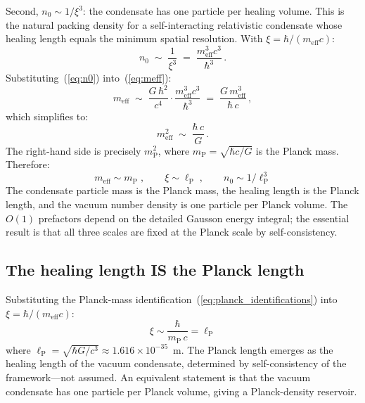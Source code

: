 \documentclass[12pt, a4paper]{article}
\newcommand{\meff}{m_{\mathrm{eff}}}
\newcommand{\lP}{\ell_{\mathrm{P}}}
\newcommand{\mP}{m_{\mathrm{P}}}
\begin{document}
Second, $n_0 \sim 1/\xi^3$: the condensate has one
particle per healing volume. This is the natural
packing density for a self-interacting relativistic
condensate whose healing length equals the minimum
spatial resolution. With $\xi = \hbar/(\meff c)$:
\begin{equation}
    n_0 \;\sim\; \frac{1}{\xi^3}
    \;=\;\frac{\meff^3 c^3}{\hbar^3}\,.
\label{eq:n0}
\end{equation}
Substituting~(\ref{eq:n0}) into~(\ref{eq:meff}):
\begin{equation}
    \meff \;\sim\; \frac{G\,\hbar^2}{c^4}
    \cdot \frac{\meff^3 c^3}{\hbar^3}
    \;=\;\frac{G\,\meff^3}{\hbar\,c}\,,
\end{equation}
which simplifies to:
\begin{equation}
    \meff^2 \;\sim\; \frac{\hbar\,c}{G}\,.
\label{eq:meff_closure}
\end{equation}
The right-hand side is precisely $\mP^2$, where
$\mP = \sqrt{\hbar c/G}$ is the Planck mass.
Therefore:
\begin{equation}
    \boxed{\;\meff \sim \mP\;,\qquad
    \xi \sim \lP\;,\qquad
    n_0 \sim 1/\lP^3\;}
\label{eq:planck_identifications}
\end{equation}
The condensate particle mass is the Planck mass, the
healing length is the Planck length, and the vacuum
number density is one particle per Planck volume.
The $O(1)$ prefactors depend on the detailed Gausson
energy integral; the essential result is that all
three scales are fixed at the Planck scale by
self-consistency.

\subsection{The healing length IS the Planck length}

Substituting the Planck-mass identification~(\ref{eq:planck_identifications})
into $\xi = \hbar/(\meff c)$:
\begin{equation}
    \boxed{\;\xi\sim\frac{\hbar}{\mP\,c}=\lP\;}
\label{eq:xi_planck}
\end{equation}
where $\lP = \sqrt{\hbar G/c^3} \approx 1.616 \times
10^{-35}$~m. The Planck length emerges as the healing
length of the vacuum condensate, determined by
self-consistency of the framework---not assumed. An
equivalent statement is that the vacuum condensate has
one particle per Planck volume, giving a Planck-density
reservoir.

\end{document}
